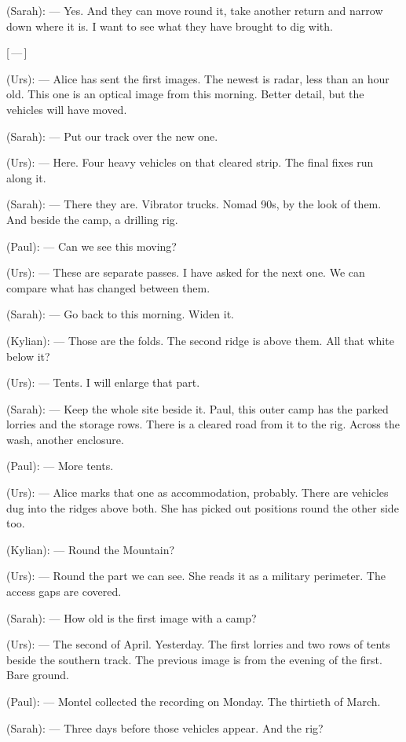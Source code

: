 \begin{room}
(Sarah): --- Yes. And they can move round it, take another return and narrow down where it is. I want to see what they have brought to dig with.

\centerline{[\,---\,]}

(Urs): --- Alice has sent the first images. The newest is radar, less than an hour old. This one is an optical image from this morning. Better detail, but the vehicles will have moved.

(Sarah): --- Put our track over the new one.

(Urs): --- Here. Four heavy vehicles on that cleared strip. The final fixes run along it.

(Sarah): --- There they are. Vibrator trucks. Nomad 90s, by the look of them. And beside the camp, a drilling rig.

(Paul): --- Can we see this moving?

(Urs): --- These are separate passes. I have asked for the next one. We can compare what has changed between them.

(Sarah): --- Go back to this morning. Widen it.

(Kylian): --- Those are the folds. The second ridge is above them. All that white below it?

(Urs): --- Tents. I will enlarge that part.

(Sarah): --- Keep the whole site beside it. Paul, this outer camp has the parked lorries and the storage rows. There is a cleared road from it to the rig. Across the wash, another enclosure.

(Paul): --- More tents.

(Urs): --- Alice marks that one as accommodation, probably. There are vehicles dug into the ridges above both. She has picked out positions round the other side too.

(Kylian): --- Round the Mountain?

(Urs): --- Round the part we can see. She reads it as a military perimeter. The access gaps are covered.

(Sarah): --- How old is the first image with a camp?

(Urs): --- The second of April. Yesterday. The first lorries and two rows of tents beside the southern track. The previous image is from the evening of the first. Bare ground.

(Paul): --- Montel collected the recording on Monday. The thirtieth of March.

(Sarah): --- Three days before those vehicles appear. And the rig?


\end{room}
